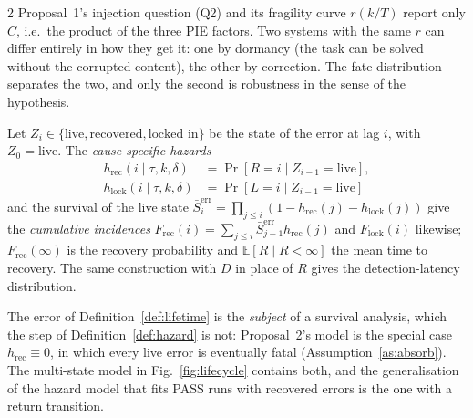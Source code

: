 \begin{multicols}{2}
Proposal~1's injection question (Q2) and its fragility curve $r(k/T)$ report only $C$, i.e.\ the product of the three PIE factors. Two systems with the same $r$ can differ entirely in how they get it: one by dormancy (the task can be solved without the corrupted content), the other by correction. The fate distribution separates the two, and only the second is robustness in the sense of the hypothesis.

\begin{definition}\label{def:lifetime}
Let $Z_i\in\{\text{live},\text{recovered},\text{locked in}\}$ be the state of the error at lag $i$, with $Z_0=\text{live}$. The \emph{cause-specific hazards}
\begin{align*}
h_{\mathrm{rec}}(i\mid\tau,k,\delta)&=\Pr[R{=}i\mid Z_{i-1}{=}\text{live}],\\
h_{\mathrm{lock}}(i\mid\tau,k,\delta)&=\Pr[L{=}i\mid Z_{i-1}{=}\text{live}]
\end{align*}
and the survival of the live state $\bar S^{\mathrm{err}}_i=\prod_{j\le i}(1-h_{\mathrm{rec}}(j)-h_{\mathrm{lock}}(j))$ give the \emph{cumulative incidences} $F_{\mathrm{rec}}(i)=\sum_{j\le i}\bar S^{\mathrm{err}}_{j-1}h_{\mathrm{rec}}(j)$ and $F_{\mathrm{lock}}(i)$ likewise; $F_{\mathrm{rec}}(\infty)$ is the recovery probability and $\mathbb{E}[R\mid R<\infty]$ the mean time to recovery. The same construction with $D$ in place of $R$ gives the detection-latency distribution.
\end{definition}

The error of Definition~\ref{def:lifetime} is the \emph{subject} of a survival analysis, which the step of Definition~\ref{def:hazard} is not: Proposal~2's model is the special case $h_{\mathrm{rec}}\equiv0$, in which every live error is eventually fatal (Assumption~\ref{as:absorb}). The multi-state model in Fig.~\ref{fig:lifecycle} contains both, and the generalisation of the hazard model that fits PASS runs with recovered errors is the one with a return transition.


\end{multicols}
